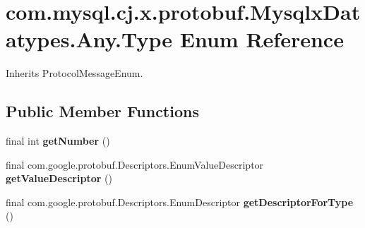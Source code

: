 \hypertarget{enumcom_1_1mysql_1_1cj_1_1x_1_1protobuf_1_1_mysqlx_datatypes_1_1_any_1_1_type}{}\section{com.\+mysql.\+cj.\+x.\+protobuf.\+Mysqlx\+Datatypes.\+Any.\+Type Enum Reference}
\label{enumcom_1_1mysql_1_1cj_1_1x_1_1protobuf_1_1_mysqlx_datatypes_1_1_any_1_1_type}


Inherits Protocol\+Message\+Enum.

\subsection*{Public Member Functions}
\begin{DoxyCompactItemize}
\item 
\mbox{\label{enumcom_1_1mysql_1_1cj_1_1x_1_1protobuf_1_1_mysqlx_datatypes_1_1_any_1_1_type_ac9686099e989c0f2036ae131f7723695}} 
final int {\bfseries get\+Number} ()
\item 
\mbox{\label{enumcom_1_1mysql_1_1cj_1_1x_1_1protobuf_1_1_mysqlx_datatypes_1_1_any_1_1_type_a1163ac9e2037bcd2c041bd1f0f44f029}} 
final com.\+google.\+protobuf.\+Descriptors.\+Enum\+Value\+Descriptor {\bfseries get\+Value\+Descriptor} ()
\item 
\mbox{\label{enumcom_1_1mysql_1_1cj_1_1x_1_1protobuf_1_1_mysqlx_datatypes_1_1_any_1_1_type_a50b1fbc7d3bd18ad4da74a9ad9b2ecf6}} 
final com.\+google.\+protobuf.\+Descriptors.\+Enum\+Descriptor {\bfseries get\+Descriptor\+For\+Type} ()
\end{DoxyCompactItemize}
